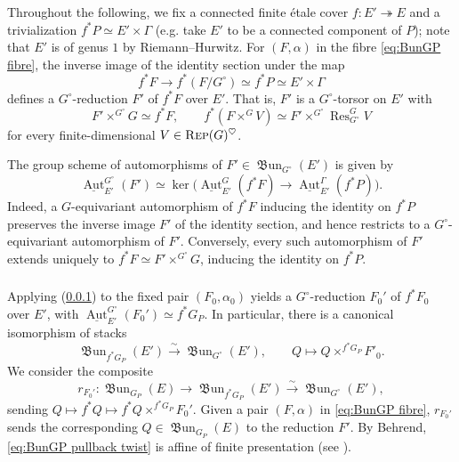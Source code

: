 \documentclass[12pt, oneside]{amsart}
\numberwithin{equation}{section}
\theoremstyle{remark}
\theoremstyle{plain}
\newcommand{\Rep}{\textsc{Rep}}
\newcommand{\frBun}{\operatorname{\mathfrak{B}un}}
\newcommand{\uAut}{\underline{\operatorname{Aut}}}
\begin{document}
\subsubsection{}\label{sssec:G^circ reduction}

Throughout the following, we fix a connected finite \'etale cover $f:E'\twoheadrightarrow E$ and a trivialization $f^*P\simeq E'\times\Gamma$ (e.g. take $E'$ to be a connected component of $P$); note that $E'$ is of genus $1$ by Riemann--Hurwitz.
For $(F,\alpha)$ in the fibre \eqref{eq:BunGP fibre}, the inverse image of the identity section under the map
\[
  f^*F \to f^*(F/G^\circ)
  \simeq f^*P \simeq E'\times\Gamma
\]
defines a $G^\circ$-reduction $F'$ of $f^*F$ over $E'$.
That is, $F'$ is a $G^\circ$-torsor on $E'$ with
\begin{equation}\label{eq:component torsor reduction}
  F'\times^{G^\circ}G\simeq f^*F,
  \qquad
  f^*(F\times^G V)\simeq F'\times^{G^\circ}\operatorname{Res}_{G^\circ}^G V
\end{equation}
for every finite-dimensional $V\in\Rep(G)^\heartsuit$.

The group scheme of automorphisms of $F' \in \frBun_{G^\circ}(E')$ is given by
\[
  \uAut_{E'}^{G^\circ}(F')
  \simeq \ker\bigl(\uAut_{E'}^G(f^*F)\to\uAut_{E'}^\Gamma(f^*P)\bigr).
\]
Indeed, a $G$-equivariant automorphism of $f^*F$ inducing the identity on $f^*P$ preserves the inverse image $F'$ of the identity section, and hence restricts to a $G^\circ$-equivariant automorphism of $F'$.
Conversely, every such automorphism of $F'$ extends uniquely to $f^*F\simeq F'\times^{G^\circ}G$, inducing the identity on $f^*P$.

\subsubsection{}\label{sssec:r map}

Applying (\ref{sssec:G^circ reduction}) to the fixed pair $(F_0,\alpha_0)$ yields a $G^\circ$-reduction $F_0'$ of $f^*F_0$ over $E'$, with $\uAut_{E'}^{G^\circ}(F_0') \simeq f^*G_P$.
In particular, there is a canonical isomorphism of stacks
\[
  \frBun_{f^*G_P}(E') \xrightarrow{\sim}
  \frBun_{G^\circ}(E'),
  \qquad Q \mapsto Q \times^{f^*G_P} F'_0.
\]
We consider the composite
\begin{equation}\label{eq:BunGP pullback twist}
  r_{F_0'}:
  \frBun_{G_P}(E) \to
  \frBun_{f^*G_P}(E') \xrightarrow{\sim}
  \frBun_{G^\circ}(E'),
\end{equation}
sending $Q\mapsto f^*Q \mapsto f^*Q\times^{f^*G_P}F_0'$.
Given a pair $(F,\alpha)$ in \eqref{eq:BunGP fibre}, $r_{F_0'}$ sends the corresponding $Q \in \frBun_{G_P}(E)$ to the reduction $F'$.
By Behrend, \eqref{eq:BunGP pullback twist} is affine of finite presentation (see \cite[Lem.~3.12]{ORT}).
\end{document}
